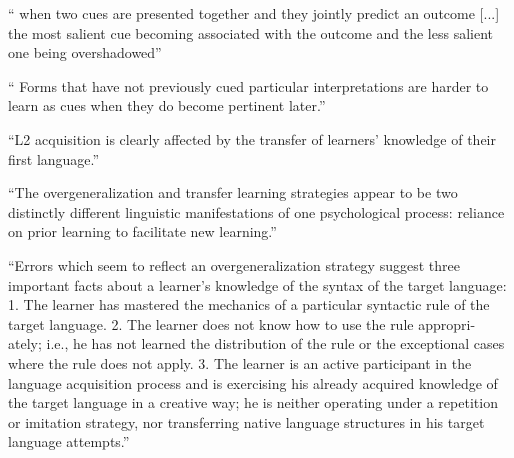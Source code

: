 
`` when two cues are presented together and they
jointly predict an outcome [...] the most salient cue becoming associated with the
outcome and the less salient one being overshadowed''

`` Forms that have not
previously cued particular interpretations are harder to learn as cues when
they do become pertinent later.''


``L2 acquisition is clearly affected by the transfer
of learners’ knowledge of their first language.''

\cite{Taylor75}
``The overgeneralization and transfer learning strategies
appear to be two distinctly different linguistic manifestations of
one psychological process: reliance on prior learning to facilitate
new learning.''

``Errors which seem to reflect an
overgeneralization strategy suggest three important facts about a
learner’s knowledge of the syntax of the target language:
1. The learner has mastered the mechanics of a particular
syntactic rule of the target language.
2. The learner does not know how to use the rule appropri-
ately; i.e., he has not learned the distribution of the rule or the
exceptional cases where the rule does not apply.
3. The learner is an active participant in the language
acquisition process and is exercising his already acquired knowledge
of the target language in a creative way; he is neither operating
under a repetition or imitation strategy, nor transferring native
language structures in his target language attempts.''





